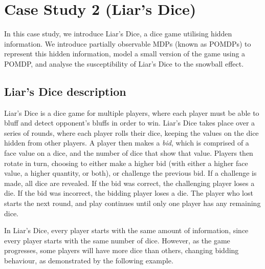 \chapter{Case Study 2 (Liar's Dice)}
\label{cs2:liars_dice}

In this case study, we introduce Liar's Dice, a dice game utilising hidden information. We introduce partially observable MDPs (known as POMDPs) to represent this hidden information, model a small version of the game using a POMDP, and analyse the susceptibility of Liar's Dice to the snowball effect.

\section{Liar's Dice description}
\label{cs2:liars_dice_description}
Liar's Dice is a dice game for multiple players, where each player must be able to bluff and detect opponent's bluffs in order to win. Liar's Dice takes place over a series of rounds, where each player rolls their dice, keeping the values on the dice hidden from other players. A player then makes a \emph{bid}, which is comprised of a face value on a dice, and the number of dice that show that value. Players then rotate in turn, choosing to either make a higher bid (with either a higher face value, a higher quantity, or both), or challenge the previous bid. If a challenge is made, all dice are revealed. If the bid was correct, the challenging player loses a die. If the bid was incorrect, the bidding player loses a die. The player who lost starts the next round, and play continues until only one player has any remaining dice.

In Liar's Dice, every player starts with the same amount of information, since every player starts with the same number of dice. However, as the game progresses, some players will have more dice than others, changing bidding behaviour, as demonstrated by the following example.


